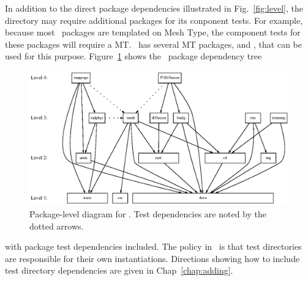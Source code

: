 In addition to the direct package dependencies illustrated in
Fig.~\ref{fig:level}, the  directory may
require additional packages for its conponent tests.  For example,
because most \draco\ packages are templated on Mesh Type, the
component tests for these packages will require a MT.  \draco\ has
several MT packages,  and \poomamt, that can be used for
this purpose.  Figure~\ref{fig:test_level} shows the \draco\ package
dependency tree
\begin{figure}
  \centerline{\includegraphics{fig/test_level.eps}}
  \caption{Package-level diagram for \draco.  Test dependencies are
    noted by the dotted arrows.}
  \label{fig:test_level}
\end{figure}
with package test dependencies included. The policy in \draco\ is that
test directories are responsible for their own instantiations.
Directions showing how to include test directory dependencies are
given in Chap~\ref{chap:adding}. 

